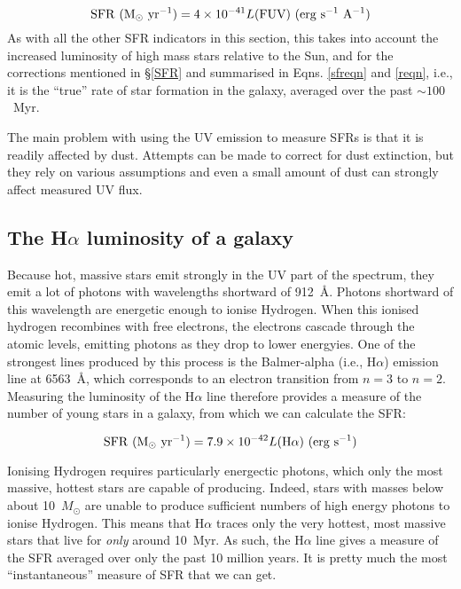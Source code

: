 \documentclass[11pt]{article}
\begin{document}
\begin{equation}
{\rm SFR~(M_\odot~yr^{-1})} = 4\times10^{-41} L(\rm FUV)~(erg~s^{-1}~A^{-1})
\end{equation}
As with all the other SFR indicators in this section, this takes into
account the increased luminosity of high mass stars relative to the
Sun, and for the corrections mentioned in \S\ref{SFR} and summarised
in Eqns. \ref{sfreqn} and \ref{reqn}, i.e., it is the ``true'' rate of
star formation in the galaxy, averaged over the past $\sim100$~Myr.

The main problem with using the UV emission to measure SFRs is that it
is readily affected by dust. Attempts can be made to correct for dust
extinction, but they rely on various assumptions and even a small
amount of dust can strongly affect measured UV flux.

\subsection{The H$\alpha$ luminosity of a galaxy}
Because hot, massive stars emit strongly in the UV part of the
spectrum, they emit a lot of photons with wavelengths shortward of
912~\AA . Photons shortward of this wavelength are energetic enough to
ionise Hydrogen. When this ionised hydrogen recombines with free
electrons, the electrons cascade through the atomic levels, emitting
photons as they drop to lower energyies. One of the strongest lines
produced by this process is the Balmer-alpha (i.e., H$\alpha$)
emission line at 6563~\AA , which corresponds to an electron
transition from $n=3$ to $n=2$. Measuring the luminosity of the
H$\alpha$ line therefore provides a measure of the number of young
stars in a galaxy, from which we can calculate the SFR:

\begin{equation}
{\rm SFR~(M_\odot~yr^{-1})} = 7.9\times10^{-42} L(\rm H\alpha)~(erg~s^{-1})
\end{equation}

Ionising Hydrogen requires particularly energectic photons, which only
the most massive, hottest stars are capable of producing. Indeed,
stars with masses below about 10~$M_\odot$ are unable to produce
sufficient numbers of high energy photons to ionise Hydrogen. This
means that H$\alpha$ traces only the very hottest, most massive stars
that live for {\it only} around 10~Myr. As such, the H$\alpha$ line
gives a measure of the SFR averaged over only the past 10 million
years. It is pretty much the most ``instantaneous'' measure of SFR
that we can get.
\end{document}
